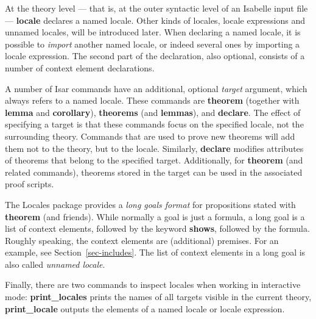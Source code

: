 \begin{isabellebody}
\begin{isamarkuptext}
  At the theory level --- that is, at the outer syntactic level of an
  Isabelle input file --- \textbf{locale} declares a named
  locale.  Other kinds of locales,
  locale expressions and unnamed locales, will be introduced later.  When
  declaring a named locale, it is possible to \emph{import} another
  named locale, or indeed several ones by importing a locale
  expression.  The second part of the declaration, also optional,
  consists of a number of context element declarations.

  A number of Isar commands have an additional, optional \emph{target}
  argument, which always refers to a named locale.  These commands
  are \textbf{theorem} (together with \textbf{lemma} and
  \textbf{corollary}),  \textbf{theorems} (and
  \textbf{lemmas}), and \textbf{declare}.  The effect of specifying a target is
  that these commands focus on the specified locale, not the
  surrounding theory.  Commands that are used to
  prove new theorems will add them not to the theory, but to the
  locale.  Similarly, \textbf{declare} modifies attributes of theorems
  that belong to the specified target.  Additionally, for
  \textbf{theorem} (and related commands), theorems stored in the target
  can be used in the associated proof scripts.

  The Locales package provides a \emph{long goals format} for
  propositions stated with \textbf{theorem} (and friends).  While
  normally a goal is just a formula, a long goal is a list of context
  elements, followed by the keyword \textbf{shows}, followed by the
  formula.  Roughly speaking, the context elements are
  (additional) premises.  For an example, see
  Section~\ref{sec-includes}.  The list of context elements in a long goal
  is also called \emph{unnamed locale}.

  Finally, there are two commands to inspect locales when working in
  interactive mode: \textbf{print\_locales} prints the names of all
  targets
  visible in the current theory, \textbf{print\_locale} outputs the
  elements of a named locale or locale expression.


\end{isamarkuptext}
\end{isabellebody}
